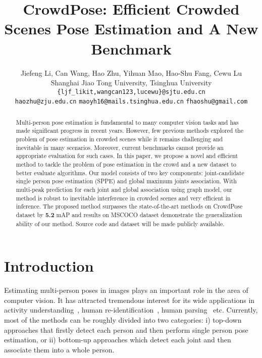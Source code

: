 \documentclass[10pt,twocolumn,letterpaper]{article}
\begin{document}
\title{CrowdPose: Efficient Crowded Scenes Pose Estimation and A New Benchmark}

\author{Jiefeng Li, Can Wang, Hao Zhu, Yihuan Mao, Hao-Shu Fang, Cewu Lu\\
{Shanghai Jiao Tong University}, {Tsinghua University}\\
{\tt\small \{{ljf\_likit},{wangcan123},{lucewu}\}@{sjtu.edu.cn}}\\
{\tt\small {haozhu}@{zju.edu.cn}} {\tt\small {maoyh16}@{mails.tsinghua.edu.cn}} {\tt\small {fhaoshu}@{gmail.com}}
}

\maketitle


\begin{abstract}
  Multi-person pose estimation is fundamental to many computer vision tasks and has made significant progress in recent years. However, few previous methods explored the problem of pose estimation in crowded scenes while it remains challenging and inevitable in many scenarios. Moreover, current benchmarks cannot provide an appropriate evaluation for such cases. In this paper, we propose a novel and efficient method to tackle the problem of pose estimation in the crowd and a new dataset to better evaluate algorithms. Our model consists of two key components: joint-candidate single person pose estimation (SPPE) and global maximum joints association. With multi-peak prediction for each joint and global association using graph model, our method is robust to inevitable interference in crowded scenes and very efficient in inference.  The proposed method surpasses the state-of-the-art methods on CrowdPose dataset by \textbf{5.2} mAP and results on MSCOCO dataset demonstrate the generalization ability of our method. Source code and dataset will be made publicly available.
\end{abstract}

\section{Introduction}
Estimating multi-person poses in images plays an important role in the area of computer vision. It has attracted tremendous interest for its wide applications in activity understanding~\cite{activity1, activity2}, human re-identification~\cite{reid1}, human parsing~\cite{parsing1, parsing2} etc. Currently, most of the methods can be roughly divided into two categories: i) top-down approaches that firstly detect each person and then perform single person pose estimation, or ii) bottom-up approaches which detect each joint and then associate them into a whole person.
\end{document}
